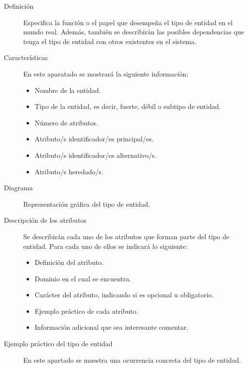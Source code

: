    \begin{description}
      \item[Definición] Especifica la función o el papel que desempeña el tipo
           de entidad en el mundo real. Además, también se describirán las
           posibles dependencias que tenga el tipo de entidad con otros
           existentes en el sistema.

      \item[Características] En este aparatado se mostrará la siguiente
           información:

            \begin{itemize}
             \item Nombre de la entidad.
             \item Tipo de la entidad, es decir, fuerte, débil o subtipo de
                   entidad.
             \item Número de atributos.
             \item Atributo/s identificador/es principal/es.
             \item Atributo/s identificador/es alternativo/s.
             \item Atributo/s heredado/s.
            \end{itemize}

      \item[Diagrama] Representación gráfica del tipo de entidad.

      \item[Descripción de los atributos] Se describirán cada uno de los
           atributos que forman parte del tipo de entidad. Para cada uno de
           ellos se indicará lo siguiente:

           \begin{itemize}
            \item Definición del atributo.
            \item Dominio en el cual se encuentra.
            \item Carácter del atributo, indicando si es opcional u obligatorio.
            \item Ejemplo práctico de cada atributo.
            \item Información adicional que sea interesante comentar.
           \end{itemize}

      \item[Ejemplo práctico del tipo de entidad] En este apartado se muestra
           una ocurrencia concreta del tipo de entidad.

   \end{description}

